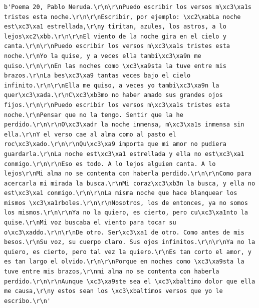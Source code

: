 \documentclass[
  spanish,
  letterpaper,
]{scrbook}
\theoremstyle{definition}
\theoremstyle{remark}
\begin{document}
\begin{verbatim}
b'Poema 20, Pablo Neruda.\r\n\r\nPuedo escribir los versos m\xc3\xa1s tristes esta noche.\r\n\r\nEscribir, por ejemplo: \xc2\xabLa noche est\xc3\xa1 estrellada,\r\ny tiritan, azules, los astros, a lo lejos\xc2\xbb.\r\n\r\nEl viento de la noche gira en el cielo y canta.\r\n\r\nPuedo escribir los versos m\xc3\xa1s tristes esta noche.\r\nYo la quise, y a veces ella tambi\xc3\xa9n me quiso.\r\n\r\nEn las noches como \xc3\xa9sta la tuve entre mis brazos.\r\nLa bes\xc3\xa9 tantas veces bajo el cielo infinito.\r\n\r\nElla me quiso, a veces yo tambi\xc3\xa9n la quer\xc3\xada.\r\nC\xc3\xb3mo no haber amado sus grandes ojos fijos.\r\n\r\nPuedo escribir los versos m\xc3\xa1s tristes esta noche.\r\nPensar que no la tengo. Sentir que la he perdido.\r\n\r\nO\xc3\xadr la noche inmensa, m\xc3\xa1s inmensa sin ella.\r\nY el verso cae al alma como al pasto el roc\xc3\xado.\r\n\r\nQu\xc3\xa9 importa que mi amor no pudiera guardarla.\r\nLa noche est\xc3\xa1 estrellada y ella no est\xc3\xa1 conmigo.\r\n\r\nEso es todo. A lo lejos alguien canta. A lo lejos\r\nMi alma no se contenta con haberla perdido.\r\n\r\nComo para acercarla mi mirada la busca.\r\nMi coraz\xc3\xb3n la busca, y ella no est\xc3\xa1 conmigo.\r\n\r\nLa misma noche que hace blanquear los mismos \xc3\xa1rboles.\r\n\r\nNosotros, los de entonces, ya no somos los mismos.\r\n\r\nYa no la quiero, es cierto, pero cu\xc3\xa1nto la quise.\r\nMi voz buscaba el viento para tocar su o\xc3\xaddo.\r\n\r\nDe otro. Ser\xc3\xa1 de otro. Como antes de mis besos.\r\nSu voz, su cuerpo claro. Sus ojos infinitos.\r\n\r\nYa no la quiero, es cierto, pero tal vez la quiero.\r\nEs tan corto el amor, y es tan largo el olvido.\r\n\r\nPorque en noches como \xc3\xa9sta la tuve entre mis brazos,\r\nmi alma no se contenta con haberla perdido.\r\n\r\nAunque \xc3\xa9ste sea el \xc3\xbaltimo dolor que ella me causa,\r\ny estos sean los \xc3\xbaltimos versos que yo le escribo.\r\n'
\end{verbatim}


\backmatter
\end{document}
